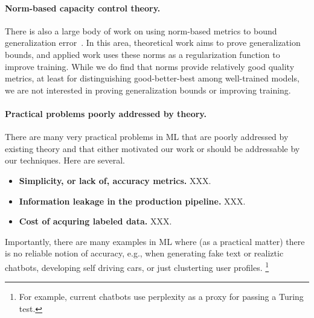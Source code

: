 \paragraph{Norm-based capacity control theory.}

There is also a large body of work on using norm-based metrics to bound generalization error~\cite{NTS15, BFT17_TR, LMBx18_TR}.
In this area, theoretical work aims to prove generalization bounds, and applied work uses these norms as a regularization function to improve training.
While we do find that norms provide relatively good quality metrics, at least for distinguishing good-better-best among well-trained models, we are not interested in proving generalization bounds or improving training.


\paragraph{Practical problems poorly addressed by theory.}
There are many very practical problems in ML that are poorly addressed by existing theory and that either motivated our work or should be addressable by our techniques.
Here are several.
\begin{itemize}
\item
\textbf{Simplicity, or lack of,  accuracy metrics.}
XXX.
\item
\textbf{Information leakage in the production pipeline.}
XXX.
\item
\textbf{Cost of acquring labeled data.}
XXX.
\end{itemize}
Importantly, there are many examples in ML where (as a practical matter) there is no reliable notion of accuracy, e.g., when generating fake text or realiztic chatbots, developing self driving cars, or just clusterting user profiles.
\footnote{For example, current chatbots use perplexity as a proxy for passing a Turing test.}
